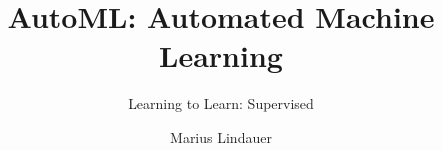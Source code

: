 




\title[AutoML: Learning to Control]{AutoML: Automated Machine Learning}
\subtitle{Learning to Learn: Supervised}
\author{Marius Lindauer}
\date{}





	
	\maketitle
	

